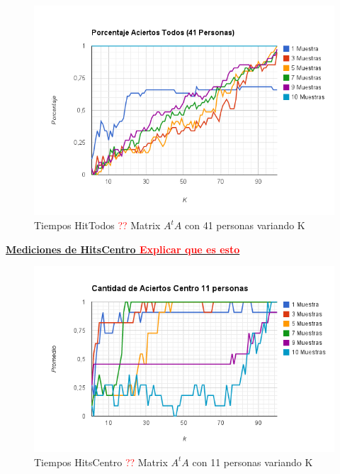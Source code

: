 \begin{figure}[H]
\includegraphics[width=1\textwidth]{img/image12.png}
     \caption{Tiempos HitTodos \textcolor{red}{??} Matrix $A^tA$ con 41 personas variando K}
     \label{fig:figura1}
\end{figure}





\underline{\textbf{Mediciones de HitsCentro \textcolor{red}{Explicar que es esto}}}

\begin{figure}[H]
\includegraphics[width=1\textwidth]{img/image13.png}
     \caption{Tiempos HitsCentro \textcolor{red}{??} Matrix $A^tA$ con 11 personas variando K}
     \label{fig:figura1}
\end{figure}

